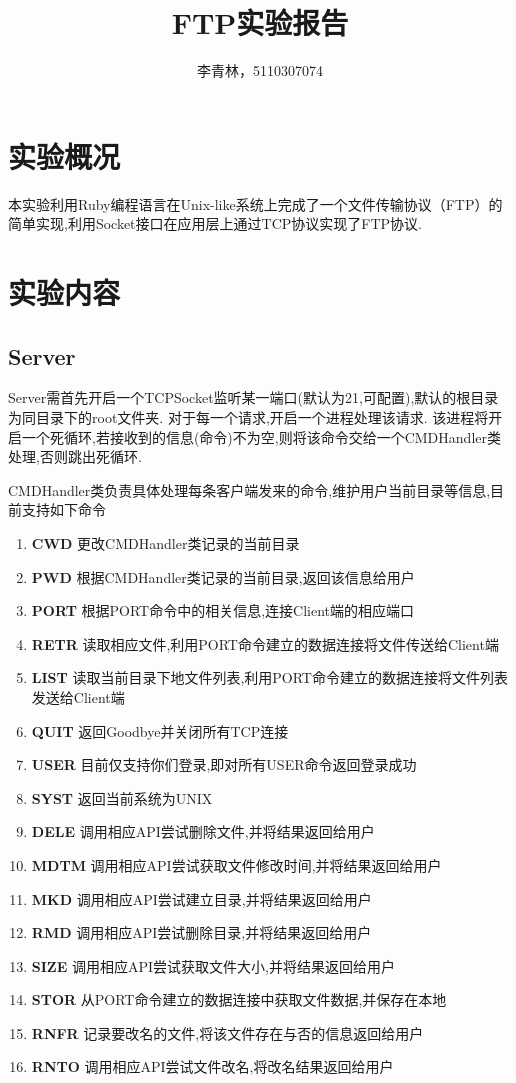 \documentclass[a4paper,11pt]{article}
\begin{document}
\pagestyle{fancy}
\rfoot{\thepage}
\setlength{\parskip}{0.7ex plus0.2ex minus0.2ex}
\cfoot{\empty}
\lhead{\empty}


\title{FTP实验报告}
\author{李青林，5110307074}
\date{}
\maketitle

\headheight 3pt
\thispagestyle{fancy}
\section{实验概况}
本实验利用Ruby编程语言在Unix-like系统上完成了一个文件传输协议（FTP）的简单实现,利用Socket接口在应用层上通过TCP协议实现了FTP协议.
\section{实验内容}
\subsection{Server}
Server需首先开启一个TCPSocket监听某一端口(默认为21,可配置),默认的根目录为同目录下的root文件夹.
对于每一个请求,开启一个进程处理该请求.
该进程将开启一个死循环,若接收到的信息(命令)不为空,则将该命令交给一个CMDHandler类处理,否则跳出死循环.

CMDHandler类负责具体处理每条客户端发来的命令,维护用户当前目录等信息,目前支持如下命令
\begin{enumerate}
\item \textbf{CWD}
更改CMDHandler类记录的当前目录
\item \textbf{PWD}
根据CMDHandler类记录的当前目录,返回该信息给用户
\item \textbf{PORT}
根据PORT命令中的相关信息,连接Client端的相应端口
\item \textbf{RETR}
读取相应文件,利用PORT命令建立的数据连接将文件传送给Client端
\item \textbf{LIST}
读取当前目录下地文件列表,利用PORT命令建立的数据连接将文件列表发送给Client端
\item \textbf{QUIT}
返回Goodbye并关闭所有TCP连接
\item \textbf{USER}
目前仅支持你们登录,即对所有USER命令返回登录成功
\item \textbf{SYST}
返回当前系统为UNIX
\item \textbf{DELE}
调用相应API尝试删除文件,并将结果返回给用户
\item \textbf{MDTM}
调用相应API尝试获取文件修改时间,并将结果返回给用户
\item \textbf{MKD}
调用相应API尝试建立目录,并将结果返回给用户
\item \textbf{RMD}
调用相应API尝试删除目录,并将结果返回给用户
\item \textbf{SIZE}
调用相应API尝试获取文件大小,并将结果返回给用户
\item \textbf{STOR}
从PORT命令建立的数据连接中获取文件数据,并保存在本地
\item \textbf{RNFR}
记录要改名的文件,将该文件存在与否的信息返回给用户
\item \textbf{RNTO}
调用相应API尝试文件改名,将改名结果返回给用户
\end{enumerate}
\end{document}
